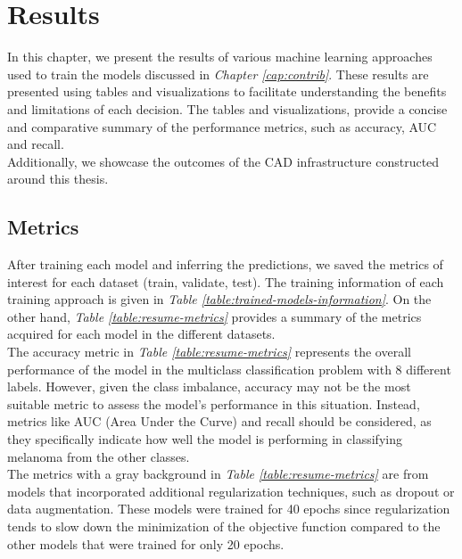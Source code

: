 \chapter{Results}
\label{cap:result}

In this chapter, we present the results of various machine learning
approaches used to train the models discussed in \textit{Chapter \ref{cap:contrib}}.
These results are presented using tables and visualizations to
facilitate understanding the benefits and limitations of each decision. The tables and visualizations,
provide a concise and comparative summary of the performance metrics, such as accuracy, AUC and recall. \\

Additionally, we showcase the outcomes of the CAD infrastructure constructed around this thesis.


\section{Metrics}

After training each model and inferring the predictions,
we saved the metrics of interest for each dataset (train, validate, test).
The training information of each training approach is given in \textit{Table \ref{table:trained-models-information}}.
On the other hand, \textit{Table \ref{table:resume-metrics}} provides a summary of the metrics acquired for each model in the different datasets. \\

The accuracy metric in \textit{Table \ref{table:resume-metrics}} represents
the overall performance of the model in the multiclass classification problem with 8 different labels.
However, given the class imbalance, accuracy may not be the most suitable metric to assess the model's performance in this situation.
Instead, metrics like AUC (Area Under the Curve) and recall should be considered,
as they specifically indicate how well the model is performing in classifying melanoma from the other classes. \\

The metrics with a gray background in \textit{Table \ref{table:resume-metrics}}
are from models that incorporated additional regularization techniques, such as dropout or data augmentation.
These models were trained for 40 epochs since regularization tends to slow down the minimization of the objective function compared
to the other models that were trained for only 20 epochs. \\

